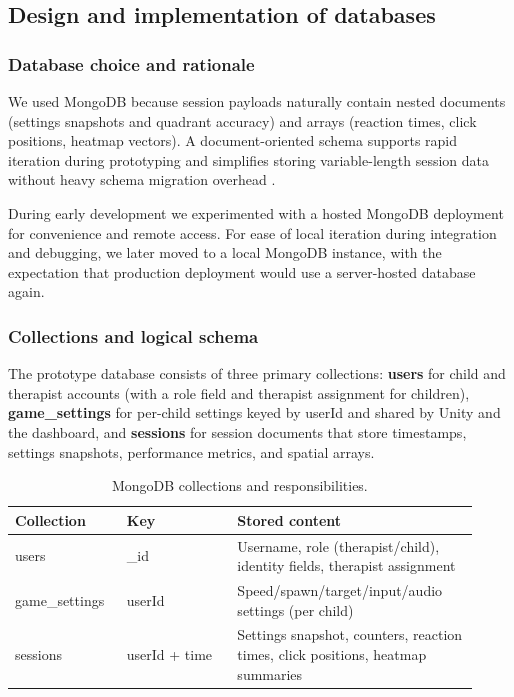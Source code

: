 \documentclass[12pt]{article}
\begin{document}
\subsection{Design and implementation of databases}
\subsubsection*{Database choice and rationale}
We used MongoDB because session payloads naturally contain nested documents (settings snapshots and quadrant accuracy) and arrays (reaction times, click positions, heatmap vectors). A document-oriented schema supports rapid iteration during prototyping and simplifies storing variable-length session data without heavy schema migration overhead \cite{ref15}.

During early development we experimented with a hosted MongoDB deployment for convenience and remote access. For ease of local iteration during integration and debugging, we later moved to a local MongoDB instance, with the expectation that production deployment would use a server-hosted database again.

\subsubsection*{Collections and logical schema}
The prototype database consists of three primary collections: \textbf{users} for child and therapist accounts (with a role field and therapist assignment for children), \textbf{game\_settings} for per-child settings keyed by userId and shared by Unity and the dashboard, and \textbf{sessions} for session documents that store timestamps, settings snapshots, performance metrics, and spatial arrays.

\begin{table}[H]
\centering
\caption{MongoDB collections and responsibilities.}
\label{tab:db_collections}
\begin{tabular}{p{0.22\linewidth} p{0.22\linewidth} p{0.48\linewidth}}
\toprule
\textbf{Collection} & \textbf{Key} & \textbf{Stored content} \\
\midrule
users & \_id & Username, role (therapist/child), identity fields, therapist assignment \\
game\_settings & userId & Speed/spawn/target/input/audio settings (per child) \\
sessions & userId + time & Settings snapshot, counters, reaction times, click positions, heatmap summaries \\
\bottomrule
\end{tabular}
\end{table}
\end{document}
